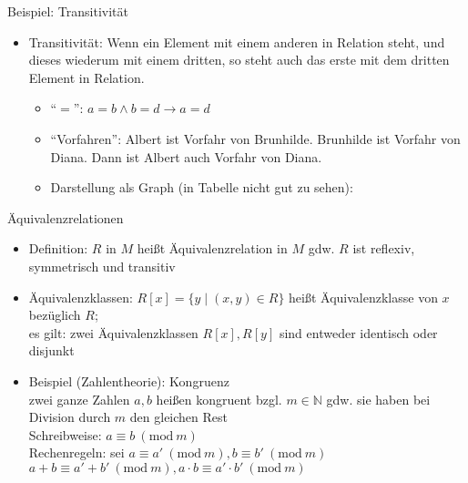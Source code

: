 \begin{frame}{Beispiel: Transitivität}
	\begin{itemize}
		\item Transitivität: Wenn ein Element mit einem anderen in Relation steht, und dieses wiederum mit einem dritten, so steht auch das erste mit dem dritten Element in Relation.
		\begin{itemize}
			\item "`$=$"': $a=b \land b=d \rightarrow a=d$
			\item "`Vorfahren"': Albert ist Vorfahr von Brunhilde. Brunhilde ist Vorfahr von Diana. Dann ist Albert auch Vorfahr von Diana.
			\item Darstellung als Graph (in Tabelle nicht gut zu sehen):\\
			\vspace{1em}
		\end{itemize}
	\end{itemize}	
\end{frame}

\begin{frame}{Äquivalenzrelationen}
	\begin{itemize}
		\item Definition: $R$ in $M$ heißt Äquivalenzrelation in $M$ gdw. $R$ ist reflexiv, symmetrisch und transitiv
		\item Äquivalenzklassen: $R[x]=\{y \mid (x,y) \in R\}$ heißt Äquivalenzklasse von $x$ bezüglich $R$;\\
			es gilt: zwei Äquivalenzklassen $R[x], R[y]$ sind entweder identisch oder disjunkt
		\item Beispiel (Zahlentheorie): Kongruenz\\
			zwei ganze Zahlen $a,b$ heißen kongruent bzgl. $m \in \mathbb{N}$ gdw. sie haben bei Division durch $m$ den gleichen Rest\\
			Schreibweise: $a \equiv b\ (\mathrm{mod}\ m)$\\
			Rechenregeln: sei $a \equiv a'\ (\mathrm{mod}\ m), b \equiv b'\ (\mathrm{mod}\ m)$\\
			$a+b\equiv a'+b'\ (\mathrm{mod}\ m), a \cdot b \equiv a' \cdot b'\ (\mathrm{mod}\ m)$
	\end{itemize}
\end{frame}

